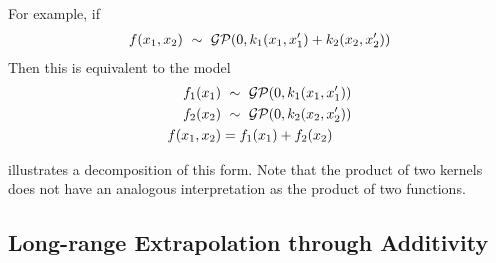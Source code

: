 %
For example, if
%
\begin{align}
f(x_1, x_2) \ \sim\  \mathcal{GP}(0, k_1(x_1, x_1') + k_2(x_2, x_2'))
\end{align}
%
Then this is equivalent to the model
%
\begin{align}
f_1(x_1) & \ \sim\  \mathcal{GP}(0, k_1(x_1, x_1'))\\
f_2(x_2) & \ \sim\  \mathcal{GP}(0, k_2(x_2, x_2'))\\
f(x_1, x_2) & = f_1(x_1) + f_2(x_2)
\end{align}
%
%

 illustrates a decomposition of this form.
Note that the product of two kernels does not have an analogous interpretation as the product of two functions.


\subsection{Long-range Extrapolation through Additivity}
\label{sec:additivity-extrapolation}

